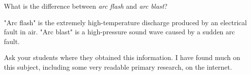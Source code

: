 

What is the difference between {\it arc flash} and {\it arc blast}?







"Arc flash" is the extremely high-temperature discharge produced by an electrical fault in air.  "Arc blast" is a high-pressure sound wave caused by a sudden arc fault.







Ask your students where they obtained this information.  I have found much on this subject, including some very readable primary research, on the internet.




